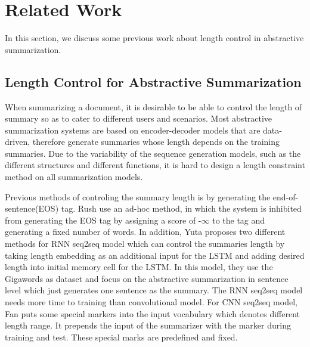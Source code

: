 \section{Related Work}
\label{sec:related}

In this section, we discuss some previous work about length control in
abstractive summarization.

\subsection{Length Control for Abstractive Summarization}
When summarizing a document, it is desirable to be able to control
the length of summary so as to cater to different users and scenarios. 
Most abstractive summarization systems are based on encoder-decoder models
that are data-driven, therefore generate
summaries whose length depends on the training summaries.
Due to the variability of the sequence generation models, such 
as the different structures and different functions, it is hard to design
a length constraint method on all summarization models.

Previous methods of controling the summary length is by generating the 
end-of-sentence(EOS) tag. Rush  use an ad-hoc method, 
in which the system is inhibited from generating the EOS tag by assigning a score of -$\infty$ to the tag and generating a fixed number of words. In addition, 
Yuta  proposes two
different methods for RNN seq2seq model which can control the summaries length by taking length
embedding as an additional input for the LSTM and adding desired length into initial memory cell for the LSTM. 
In this model, they use the Gigawords as dataset and focus on the abstractive summarization in sentence level 
which just generates one sentence as the summary.
The RNN seq2seq model needs more time to training
than convolutional model. For CNN seq2seq model, Fan 
puts some special markers into the input vocabulary which denotes different length range.
It prepends the input of the summarizer with the marker during training and test. These special marks are predefined
and fixed. 


